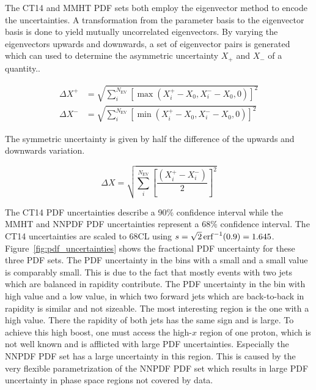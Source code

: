 The CT14 and MMHT PDF sets both employ the eigenvector method to encode the
uncertainties. A transformation from the parameter basis to the eigenvector
basis is done to yield mutually uncorrelated eigenvectors. By varying the
eigenvectors upwards and downwards, a set of eigenvector pairs is generated which can used to
determine the asymmetric uncertainty $X_+$ and $X_-$ of a quantity..

\begin{equation*}
\begin{aligned}
\Delta X^+ &= \sqrt{\sum_i^{N_{\mathrm{EV}}} \left[ \max(X_i^+ -X_0, X_i^- - X_0, 0)\right]^2}\\
\Delta X^- &= \sqrt{\sum_i^{N_{\mathrm{EV}}} \left[ \min(X_i^+ -X_0, X_i^- - X_0,0)\right]^2}
\end{aligned}
\end{equation*}

The symmetric uncertainty is given by half the difference of the upwards and
downwards variation.

\begin{equation*}
    \Delta X = \sqrt{\sum_i^{N_{\mathrm{EV}}} \left[ \frac{\left( X_i^+ -
    X_i^-\right)}{2} \right]^2}
\end{equation*}

The CT14 PDF uncertainties describe a 90\% confidence interval while the MMHT
and NNPDF PDF uncertainties represent a 68\% confidence interval. The CT14
uncertainties are scaled to 68CL using $s = \sqrt{2} \operatorname{erf}^{-1}(0.9) = 1.645$.
Figure~\ref{fig:pdf_uncertainties} shows the fractional PDF uncertainty for
these three PDF sets. The PDF uncertainty in the bins with a small \ystar and a
small \yboost value is comparably small. This is due to the fact that mostly
events with two jets which are balanced in rapidity contribute. The PDF
uncertainty in the bin with high \ystar value and a low \yboost value, in which
two forward jets which are back-to-back in rapidity is similar and not sizeable.
The most interesting region is the one with a high \yboost value. There the
rapidity of both jets has the same sign and is large. To achieve this high boost, one
must access the high-$x$ region of one proton, which is not well known and is
afflicted with large PDF uncertainties. Especially the NNPDF PDF set has a large
uncertainty in this region. This is caused by the very flexible parametrization
of the NNPDF PDF set which results in large PDF uncertainty in phase space
regions not covered by data.

